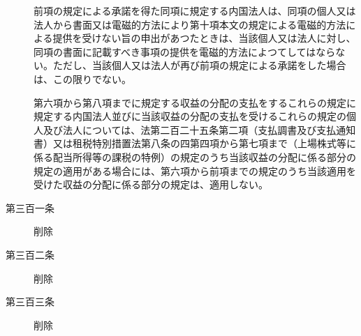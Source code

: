 \documentclass[twocolumn,a4j,10pt]{ltjtarticle}
\begin{document}
\begin{description}
\item[]前項の規定による承諾を得た同項に規定する内国法人は、同項の個人又は法人から書面又は電磁的方法により第十項本文の規定による電磁的方法による提供を受けない旨の申出があつたときは、当該個人又は法人に対し、同項の書面に記載すべき事項の提供を電磁的方法によつてしてはならない。ただし、当該個人又は法人が再び前項の規定による承諾をした場合は、この限りでない。
\item[]第六項から第八項までに規定する収益の分配の支払をするこれらの規定に規定する内国法人並びに当該収益の分配の支払を受けるこれらの規定の個人及び法人については、法第二百二十五条第二項（支払調書及び支払通知書）又は租税特別措置法第八条の四第四項から第七項まで（上場株式等に係る配当所得等の課税の特例）の規定のうち当該収益の分配に係る部分の規定の適用がある場合には、第六項から前項までの規定のうち当該適用を受けた収益の分配に係る部分の規定は、適用しない。
\end{description}
\begin{description}
\item[第三百一条]削除
\end{description}
\begin{description}
\item[第三百二条]削除
\end{description}
\begin{description}
\item[第三百三条]削除
\end{description}
\end{document}
